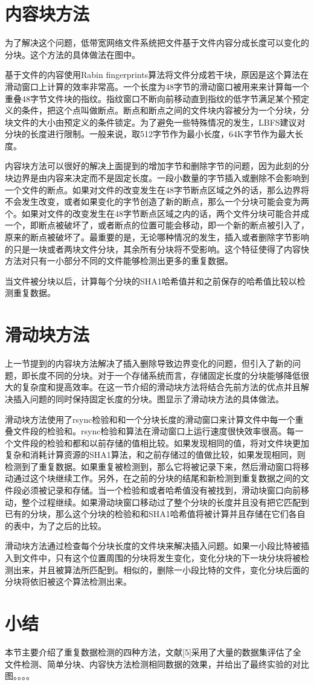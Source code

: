 \section{内容块方法}
\label{sec:contentchunk}

为了解决这个问题，低带宽网络文件系统把文件基于文件内容分成长度可以变化的分块。这个方法的具体做法在图中。

基于文件的内容使用Rabin fingerprints算法将文件分成若干块，原因是这个算法在滑动窗口上计算的效率非常高。一个长度为48字节的滑动窗口被用来来计算每一个重叠48字节文件块的指纹。指纹窗口不断向前移动直到指纹的低字节满足某个预定义的条件，把这个点叫做断点。断点和断点之间的文件块内容被分为一个分块，分块文件的大小由预定义的条件锁定。为了避免一些特殊情况的发生，LBFS建议对分块的长度进行限制。一般来说，取512字节作为最小长度，64K字节作为最大长度。

内容块方法可以很好的解决上面提到的增加字节和删除字节的问题，因为此刻的分块边界是由内容来决定而不是固定长度。一段小数量的字节插入或删除不会影响到一个文件的断点。如果对文件的改变发生在48字节断点区域之外的话，那么边界将不会发生改变，或者如果变化的字节创造了新的断点，那么一个分块可能会变为两个。如果对文件的改变发生在48字节断点区域之内的话，两个文件分块可能合并成一个，即断点被破坏了，或者断点的位置可能会移动，即一个新的断点被引入了，原来的断点被破坏了。最重要的是，无论哪种情况的发生，插入或者删除字节影响的只是一块或者两块文件分块，其余所有分块将不受影响。这个特征使得了内容快方法对只有一小部分不同的文件能够检测出更多的重复数据。

当文件被分块以后，计算每个分块的SHA1哈希值并和之前保存的哈希值比较以检测重复数据。

\section{滑动块方法}
\label{sec:slidingblock}

上一节提到的内容块方法解决了插入删除导致边界变化的问题，但引入了新的问题，即长度不同的分块。对于一个存储系统而言，存储固定长度的分块能够降低很大的复杂度和提高效率。在这一节介绍的滑动块方法将结合先前方法的优点并且解决插入问题的同时保持固定长度的分块。图显示了滑动块方法的具体做法。

滑动块方法使用了rsync检验和和一个分块长度的滑动窗口来计算文件中每一个重叠文件段的检验和。rsync检验和算法在滑动窗口上运行速度很快效率很高。每一个文件段的检验和都和以前存储的值相比较。如果发现相同的值，将对文件块更加复杂和消耗计算资源的SHA1算法，和之前存储过的值做比较，如果发现相同，则检测到了重复数据。如果重复被检测到，那么它将被记录下来，然后滑动窗口将移动通过这个块继续工作。另外，在之前的分块的结尾和新检测到重复数据之间的文件段必须被记录和存储。当一个检验和或者哈希值没有被找到，滑动块窗口向前移动，整个过程继续。如果滑动块窗口移动过了整个分块的长度并且没有把它匹配到已有的分块，那么这个分块的检验和和SHA1哈希值将被计算并且存储在它们各自的表中，为了之后的比较。

滑动块方法通过检查每个分块长度的文件块来解决插入问题。如果一小段比特被插入到文件中，只有这个位置周围的分块将发生变化，变化分块的下一块分块将被检测出来，并且被算法所匹配到。相似的，删除一小段比特的文件，变化分块后面的分块将依旧被这个算法检测出来。

\section{小结}
本节主要介绍了重复数据检测的四种方法，文献[5]采用了大量的数据集评估了全文件检测、简单分块、内容快方法检测相同数据的效果，并给出了最终实验的对比图。。。。
\label{sec:relatedwork}
